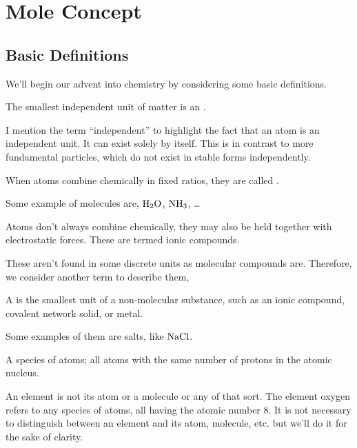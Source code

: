 \chapter{Mole Concept}

\section{Basic Definitions}

We'll begin our advent into chemistry by considering some basic definitions.


\begin{definition}
    The smallest independent unit of matter is an .
\end{definition}

I mention the term ``independent'' to highlight the fact that an atom is an independent unit. It can exist solely by itself. This is in contrast to 
more fundamental particles, which do not exist in stable forms independently.  

\begin{definition}
    When atoms combine chemically in fixed ratios, they are called .
\end{definition}

Some example of molecules are, \(\ce{H2O}\), \(\ce{NH3}\), \dots

Atoms don't always combine chemically, they may also be held together with
electrostatic forces. These are termed ionic compounds. 

These aren't found in some discrete units as molecular compounds are. Therefore,
we consider another term to describe them,

\begin{definition}
    A  is the smallest unit of a non-molecular substance, such as an ionic compound, covalent network solid, or metal.
\end{definition}

Some examples of them are salts, like \(\ce{NaCl}\). 

\begin{definition}
    A species of atoms; all atoms with the same number of protons in the atomic nucleus.
\end{definition}

An element is not its atom or a molecule or any of that sort. The element 
oxygen refers to any species of atoms, all having the atomic number \(8\). It
is not necessary to distinguish between an element and its atom, molecule, etc. but we'll
do it for the sake of clarity. 

